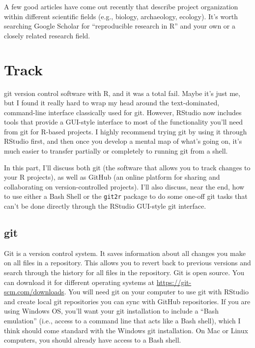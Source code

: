 \documentclass[]{tufte-book}
\begin{document}
A few good articles have come out recently that describe project organization within
different scientific fields (e.g., biology, archaeology, ecology).
It's worth searching Google Scholar for ``reproducible research in R'' and your own
or a closely related research field.

\hypertarget{track}{%
\chapter{Track}\label{track}}

 git version control software with R, and
it was a total fail. Maybe it's just me, but I found it really hard to wrap my head around
the text-dominated, command-line interface classically used for git. However, RStudio now
includes tools that provide a GUI-style
interface to most of the functionality you'll need from git for R-based projects. I highly
recommend trying git by using it through RStudio first, and then once you develop a mental
map of what's going on, it's much easier to transfer partially or completely to running git
from a shell.

In this part, I'll discuss both git (the software that allows you to track changes to your
R projects), as well as GitHub (an online platform for sharing and collaborating on
version-controlled projects). I'll also discuss, near the end, how to use either a Bash
Shell or the \texttt{git2r} package to do some one-off git tasks that can't be done directly through
the RStudio GUI-style git interface.

\hypertarget{git}{%
\section{git}\label{git}}

Git is a version control system. It saves information about all changes you make
on all files in a repository. This allows you to revert back to previous
versions and search through the history for all files in the repository. Git is
open source. You can download it for different operating systems at
\url{https://git-scm.com/downloads}. You will need git on your computer to use git
with RStudio and create local git repositories you can sync with GitHub
repositories. If you are using Windows OS, you'll want your git installation to
include a ``Bash emulation'' (i.e., access to a command line that acts like a Bash
shell), which I think should come standard with the Windows git installation.
On Mac or Linux computers, you should already have access to a Bash shell.
\end{document}
